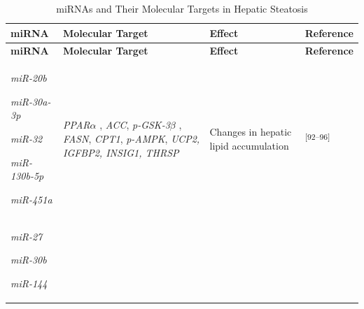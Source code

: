 \documentclass[
  11pt,
  letterpaper,
]{book}
\begin{document}
\begin{longtable}[]{@{}
  >{\centering\arraybackslash}p{}
  >{\centering\arraybackslash}p{}
  >{\raggedright\arraybackslash}p{}
  >{\centering\arraybackslash}p{}@{}}
\caption{miRNAs and Their Molecular Targets in Hepatic
Steatosis}\tabularnewline
\toprule\noalign{}
\begin{minipage}[b]{\linewidth}\centering
\textbf{miRNA}
\end{minipage} & \begin{minipage}[b]{\linewidth}\centering
\textbf{Molecular Target}
\end{minipage} & \begin{minipage}[b]{\linewidth}\raggedright
\textbf{Effect}
\end{minipage} & \begin{minipage}[b]{\linewidth}\centering
\textbf{Reference}
\end{minipage} \\
\midrule\noalign{}
\endfirsthead
\toprule\noalign{}
\begin{minipage}[b]{\linewidth}\centering
\textbf{miRNA}
\end{minipage} & \begin{minipage}[b]{\linewidth}\centering
\textbf{Molecular Target}
\end{minipage} & \begin{minipage}[b]{\linewidth}\raggedright
\textbf{Effect}
\end{minipage} & \begin{minipage}[b]{\linewidth}\centering
\textbf{Reference}
\end{minipage} \\
\midrule\noalign{}
\endhead
\bottomrule\noalign{}
\endlastfoot
\emph{miR-20b}

\emph{miR-30a-3p}

\emph{miR-32}

\emph{miR-130b-5p}

\emph{miR-451a} & \emph{PPAR}\(\alpha\) , \emph{ACC},
\emph{p-GSK-3}\(\beta\) , \emph{FASN}, \emph{CPT1}, \emph{p-AMPK},
\emph{UCP2, IGFBP2, INSIG1, THRSP} & Changes in hepatic lipid
accumulation & \textsuperscript{{[}92--96{]}} \\
\emph{miR-27}

\emph{miR-30b}

\emph{miR-144}


\end{longtable}
\end{document}
